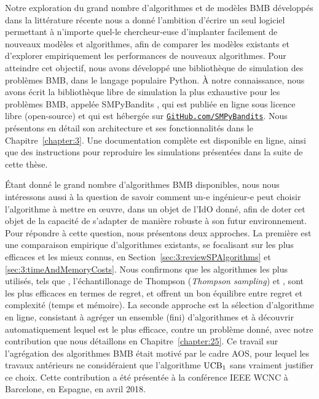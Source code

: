 \begin{resume_fr}
%
Notre exploration du grand nombre d'algorithmes et de modèles BMB développés dans la littérature récente
nous a donné l'ambition d'écrire un seul logiciel permettant à n'importe quel-le chercheur-euse d'implanter facilement de nouveaux modèles et algorithmes, afin de comparer les modèles existants et d'explorer empiriquement les performances de nouveaux algorithmes.
Pour atteindre cet objectif, nous avons développé une bibliothèque de simulation des problèmes BMB, dans le langage populaire Python.
%
À notre connaissance, nous avons écrit la bibliothèque libre de simulation la plus exhaustive pour les problèmes BMB, appelée SMPyBandits \cite{SMPyBanditsJMLR,SMPyBandits}, qui est publiée en ligne sous licence libre (open-source) et qui est hébergée sur \href{https://GitHub.com/SMPyBandits}{\texttt{GitHub.com/SMPyBandits}}.
Nous présentons en détail son architecture et ses fonctionnalités dans le Chapitre~\ref{chapter:3}.
Une documentation complète est disponible en ligne, ainsi que des instructions pour reproduire les simulations présentées dans la suite de cette thèse.


%
Étant donné le grand nombre d'algorithmes BMB disponibles, nous nous intéressons aussi à la question de savoir comment un-e ingénieur-e peut choisir l'algorithme à mettre en œuvre, dans un objet de l'IdO donné, afin de doter cet objet de la capacité de s'adapter de manière robuste à son futur environnement.
Pour répondre à cette question, nous présentons deux approches.
La première est une comparaison empirique d'algorithmes existants, se focalisant sur les plus efficaces et les mieux connus, en Section~\ref{sec:3:reviewSPAlgorithms} et \ref{sec:3:timeAndMemoryCosts}.
Nous confirmons que les algorithmes les plus utilisés, tels que \UCB{} \cite{Auer02}, l'échantillonage de Thompson (\emph{Thompson sampling}) \cite{Thompson33} et \klUCB{} \cite{KLUCBJournal}, sont les plus efficaces en termes de regret, et offrent un bon équilibre entre regret et complexité (temps et mémoire).
La seconde approche est la sélection d'algorithme en ligne, consistant à agréger un ensemble (fini) d'algorithmes et à découvrir automatiquement lequel est le plus efficace, contre un problème donné, avec notre contribution \Aggr{} que nous détaillons en Chapitre~\ref{chapter:25}.
Ce travail sur l'agrégation des algorithmes BMB était motivé par le cadre AOS, pour lequel les travaux antérieurs ne considéraient que l'algorithme $\mathrm{UCB}_1$ sans vraiment justifier ce choix.
Cette contribution a été présentée à la conférence IEEE WCNC à Barcelone, en Espagne, en avril 2018.



\end{resume_fr}
